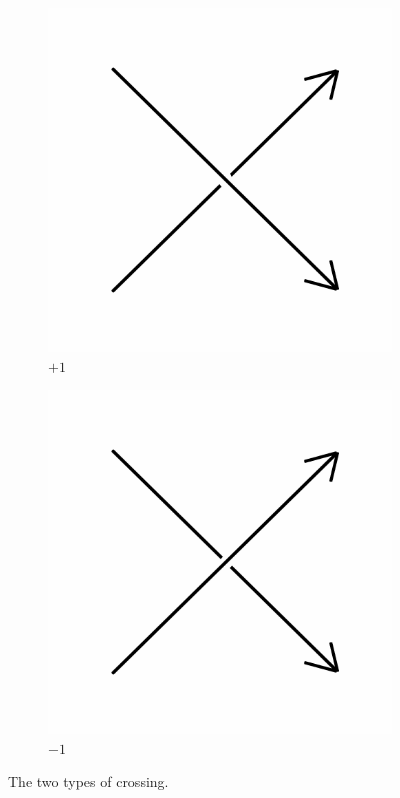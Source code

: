 \documentclass[12pt,letterpaper]{article}
\theoremstyle{definition}
\begin{document}
\begin{figure}[h]
    \centering
    \begin{subfigure}{.3\textwidth}
        \centering
        \includegraphics[width=\textwidth]{rgp11pics/poscross.png}
        \caption{$+1$}
    \end{subfigure}
    \hspace{1cm}
    \begin{subfigure}{.3\textwidth}
        \centering         
        \includegraphics[width=\textwidth]{rgp11pics/negcross.png}
        \caption{$-1$}
    \end{subfigure}
    \caption{The two types of crossing.}
\end{figure}
\end{document}
